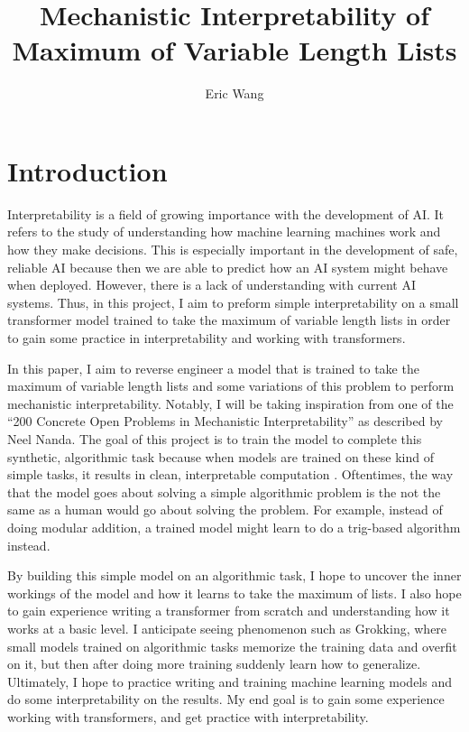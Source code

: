 \documentclass{article}
\title{Mechanistic Interpretability of Maximum of Variable Length Lists}
\author{Eric Wang}
\begin{document}
\maketitle

\section{Introduction}

Interpretability is a field of growing importance with the development of AI. It refers to the study of understanding how machine learning machines work and how they make decisions. This is especially important in the development of safe, reliable AI because then we are able to predict how an AI system might behave when deployed. However, there is a lack of understanding with current AI systems. Thus, in this project, I aim to preform simple interpretability on a small transformer model trained to take the maximum of variable length lists in order to gain some practice in interpretability and working with transformers.

In this paper, I aim to reverse engineer a model that is trained to take the maximum of variable length lists and some variations of this problem to perform mechanistic interpretability. Notably, I will be taking inspiration from one of the ``200 Concrete Open Problems in Mechanistic Interpretability'' as described by Neel Nanda. The goal of this project is to train the model to complete this synthetic, algorithmic task because when models are trained on these kind of simple tasks, it results in clean, interpretable computation \cite{1}. Oftentimes, the way that the model goes about solving a simple algorithmic problem is the not the same as a human would go about solving the problem. For example, instead of doing modular addition, a trained model might learn to do a trig-based algorithm instead.

By building this simple model on an algorithmic task, I hope to uncover the inner workings of the model and how it learns to take the maximum of lists. I also hope to gain experience writing a transformer from scratch and understanding how it works at a basic level. I anticipate seeing phenomenon such as Grokking, where small models trained on algorithmic tasks memorize the training data and overfit on it, but then after doing more training suddenly learn how to generalize. Ultimately, I hope to practice writing and training machine learning models and do some interpretability on the results. My end goal is to gain some experience working with transformers, and get practice with interpretability. 
\end{document}
